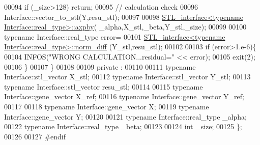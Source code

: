 \begin{DoxyCode}
00094     \textcolor{keywordflow}{if} (\_size>128) \textcolor{keywordflow}{return};
00095     \textcolor{comment}{// calculation check}
00096     Interface::vector\_to\_stl(Y,resu\_stl);
00097 
00098     \hyperlink{class_s_t_l__interface}{STL\_interface<typename Interface::real\_type>::axpby}(
      \_alpha,X\_stl,\_beta,Y\_stl,\_size);
00099 
00100     \textcolor{keyword}{typename} Interface::real\_type error=
00101       \hyperlink{class_s_t_l__interface}{STL\_interface<typename Interface::real\_type>::norm\_diff}
      (Y\_stl,resu\_stl);
00102 
00103     \textcolor{keywordflow}{if} (error>1.e-6)\{
00104       INFOS(\textcolor{stringliteral}{"WRONG CALCULATION...residual="} << error);
00105       exit(2);
00106     \}
00107   \}
00108 
00109 private :
00110 
00111   \textcolor{keyword}{typename} Interface::stl\_vector X\_stl;
00112   \textcolor{keyword}{typename} Interface::stl\_vector Y\_stl;
00113   \textcolor{keyword}{typename} Interface::stl\_vector resu\_stl;
00114 
00115   \textcolor{keyword}{typename} Interface::gene\_vector X\_ref;
00116   \textcolor{keyword}{typename} Interface::gene\_vector Y\_ref;
00117 
00118   \textcolor{keyword}{typename} Interface::gene\_vector X;
00119   \textcolor{keyword}{typename} Interface::gene\_vector Y;
00120 
00121   \textcolor{keyword}{typename} Interface::real\_type \_alpha;
00122   \textcolor{keyword}{typename} Interface::real\_type \_beta;
00123 
00124   \textcolor{keywordtype}{int} \_size;
00125 \};
00126 
00127 \textcolor{preprocessor}{#endif}
\end{DoxyCode}
